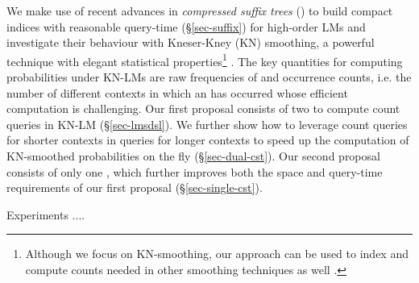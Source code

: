 We make use of recent advances in 
\emph{compressed suffix trees} (\CSTs) \cite{nv-csurv07} 
to build compact indices  
with reasonable query-time (\S\ref{sec-suffix}) 
for high-order  LMs and investigate their behaviour 
with Kneser-Kney (KN) smoothing,  
a powerful technique with elegant statistical properties\footnote{Although
we focus on KN-smoothing, our approach can be used to index and compute
counts needed in other smoothing techniques as well \cite{chen1996empirical}.}  
\cite{kneser1995improved}.
% 
The key quantities for computing probabilities under KN-LMs
are raw frequencies of \ngrams 
and occurrence counts, i.e. the number of different contexts 
in which an \ngram has 
occurred whose efficient computation is challenging. 
%
%
Our first proposal consists of two \CSTs to compute count queries 
in KN-LM (\S\ref{sec-lmsdsl}). 
% 
We further show how to leverage count queries for shorter contexts in queries for 
longer contexts to speed up the computation of KN-smoothed probabilities on the fly 
(\S\ref{sec-dual-cst}).
%
Our second proposal consists of only one %
\CST, which further improves both the space and query-time requirements
of our first proposal (\S\ref{sec-single-cst}). 
% 

Experiments ....


%

